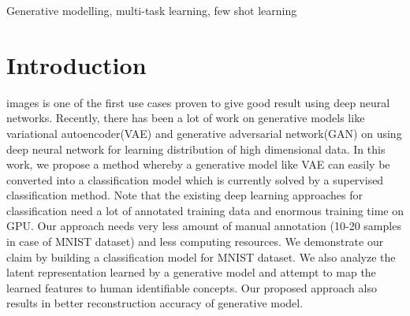\documentclass[journal]{IEEEtran}
\begin{document}
\begin{IEEEkeywords}
Generative modelling, multi-task learning, few shot learning
\end{IEEEkeywords}


%
\IEEEpeerreviewmaketitle


\section{Introduction}
% 
% 
% 
% 
 images is one of the first use cases proven to give good result using deep neural networks. Recently, there has been a lot of work on generative models like variational autoencoder(VAE)\cite{vae} and generative adversarial network(GAN) \cite{gan} on using deep neural network for learning distribution of high dimensional data. In this work, we propose a method whereby a generative model like VAE can easily be converted into a classification model which is currently solved by a supervised classification method. Note that the existing deep learning approaches for classification  need a lot of annotated training data and enormous training time on GPU\cite{alexnet}\cite{vggnet}\cite{resnet}.  Our approach needs very less amount of manual annotation (10-20 samples in case of MNIST dataset)  and less computing resources. We demonstrate our claim by building a classification model for MNIST dataset.  We also analyze the latent representation learned by a generative model and attempt to map the learned features to human identifiable concepts.  Our proposed approach also results in better reconstruction accuracy of generative model.
\end{document}
